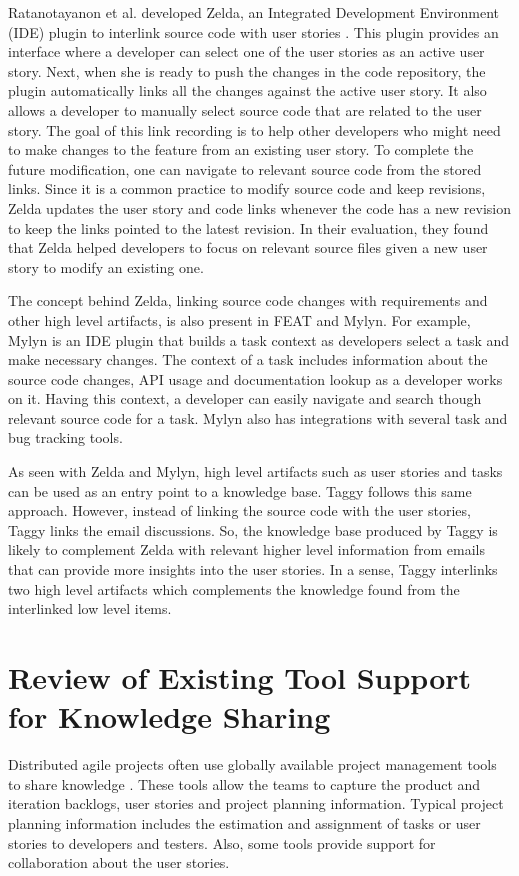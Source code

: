 Ratanotayanon et al. developed Zelda, an Integrated Development Environment (IDE) plugin to interlink source code with user stories \cite{supporting_program}. This plugin provides an interface where a developer can select one of the user stories as an active user story. Next, when she is ready to push the changes in the code repository, the plugin automatically links all the changes against the active user story. It also allows a developer to manually select source code that are related to the user story. The goal of this link recording is to help other developers who might need to make changes to the feature from an existing user story. To complete the future modification, one can navigate to relevant source code from the stored links. Since it is a common practice to modify source code and keep revisions, Zelda updates the user story and code links whenever the code has a new revision to keep the links pointed to the latest revision. In their evaluation, they found that Zelda helped developers to focus on relevant source files given a new user story to modify an existing one.

The concept behind Zelda, linking source code changes with requirements and other high level artifacts, is also present in FEAT\cite{feat} and Mylyn\cite{mylyn}. For example, Mylyn is an IDE plugin that builds a task context as developers select a task and make necessary changes. The context of a task includes information about the source code changes, API usage and documentation lookup as a developer works on it. Having this context, a developer can easily navigate and search though relevant source code for a task. Mylyn also has integrations with several task and bug tracking tools.

As seen with Zelda and Mylyn, high level artifacts such as user stories and tasks can be used as an entry point to a knowledge base. Taggy follows this same approach. However, instead of linking the source code with the user stories, Taggy links the email discussions. So, the knowledge base produced by Taggy is likely to complement Zelda with relevant higher level information from emails that can provide more insights into the user stories. In a sense, Taggy interlinks two high level artifacts which complements the knowledge found from the interlinked low level items.

\section{Review of Existing Tool Support for Knowledge Sharing}
Distributed agile projects often use globally available project management tools to share knowledge \cite{essential_communication}. These tools allow the teams to capture the product and iteration backlogs, user stories and project planning information. Typical project planning information includes the estimation and assignment of tasks or user stories to developers and testers. Also, some tools provide support for collaboration about the user stories.

